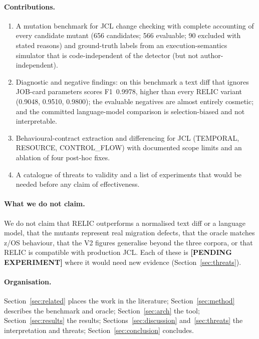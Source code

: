 \paragraph{Contributions.}
\begin{enumerate}
  \item A mutation benchmark for JCL change checking with complete accounting of
    every candidate mutant (656 candidates; 566 evaluable; 90 excluded with
    stated reasons) and ground-truth labels from an execution-semantics
    simulator that is code-independent of the detector (but not
    author-independent).
  \item Diagnostic and negative findings: on this benchmark a text diff that
    ignores JOB-card parameters scores F1~0.9978, higher than every RELIC variant
    (0.9048, 0.9510, 0.9800); the evaluable negatives are almost entirely
    cosmetic; and the committed language-model comparison is selection-biased
    and not interpretable.
  \item Behavioural-contract extraction and differencing for JCL
    (TEMPORAL, RESOURCE, CONTROL\_FLOW) with documented scope limits and an
    ablation of four post-hoc fixes.
  \item A catalogue of threats to validity and a list of experiments that would
    be needed before any claim of effectiveness.
\end{enumerate}

\paragraph{What we do not claim.} We do not claim that RELIC outperforms a
normalised text diff or a language model, that the mutants represent real
migration defects, that the oracle matches z/OS behaviour, that the V2 figures
generalise beyond the three corpora, or that RELIC is compatible with
production JCL. Each of these is \textbf{[PENDING EXPERIMENT]} where it would
need new evidence (Section~\ref{sec:threats}).

\paragraph{Organisation.} Section~\ref{sec:related} places the work in the
literature; Section~\ref{sec:method} describes the benchmark and oracle;
Section~\ref{sec:arch} the tool; Section~\ref{sec:results} the results;
Sections~\ref{sec:discussion} and~\ref{sec:threats} the interpretation and
threats; Section~\ref{sec:conclusion} concludes.
